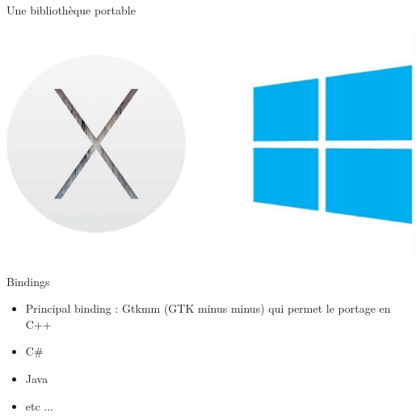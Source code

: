 \documentclass{beamer}
\begin{document}
\begin{frame}{Une bibliothèque portable}
\begin{itemize}
 \includegraphics[scale=0.15]{Pictures/os_x_windows_thumb800.jpg}

	\end{itemize}
\end{frame}


\begin{frame}{Bindings}
	\begin{itemize}
      \item Principal binding : Gtkmm (GTK minus minus) qui permet le portage en C++  
      \item C\#  
      \item Java  
      \item etc ...
	\end{itemize}
\end{frame}
\end{document}
